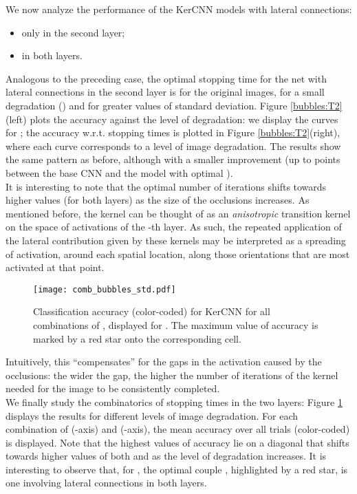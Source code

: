 \documentclass[11pt,oneside,reqno]{amsart}
\begin{document}
 We now analyze the performance of the KerCNN models with lateral connections:
  \begin{itemize}
  \item only in the second layer;
  \item in both layers.
 \end{itemize}
 Analogous to the preceding case, the optimal stopping time for the net with lateral connections in the second layer is  for the original images,  for a small degradation () and  for greater values of standard deviation. Figure \ref{bubbles:T2}(left) plots the accuracy against the level of degradation: we display the curves for ; the accuracy w.r.t. stopping times  is plotted in Figure \ref{bubbles:T2}(right), where each curve corresponds to a level of image degradation. The results show the same pattern as before, although with a smaller improvement (up to  points between the base CNN and the model with optimal ).\\
 It is interesting to note that the optimal number of iterations shifts towards higher values (for both layers) as the size of the occlusions increases. As mentioned before, the kernel  can be thought of as an \emph{anisotropic} transition kernel on the space of activations of the -th layer. As such, the repeated application of the lateral contribution given by these kernels may be interpreted as a spreading of activation, around each spatial location, along those orientations that are most activated at that point. 
 \begin{figure}[htbp!]
  \centering
 \texttt{[image: comb\_bubbles\_std.pdf]}
 \caption{Classification accuracy (color-coded) for KerCNN for all combinations of , displayed for . The maximum value of accuracy is marked by a red star onto the corresponding cell.}\label{comb_bubbles}
 \end{figure}
 Intuitively, this ``compensates'' for the gaps in the activation caused by the occlusions: the wider the gap, the higher the number of iterations of the kernel needed for the image to be consistently completed.\\
 We finally study the combinatorics of stopping times  in the two layers: Figure \ref{comb_bubbles} displays the results for different levels of image degradation. For each combination of  (-axis) and  (-axis), the mean accuracy over all trials (color-coded) is displayed. Note that the highest values of accuracy lie on a diagonal that shifts towards higher values of both  and  as the level of degradation increases. It is interesting to observe that, for , the optimal couple , highlighted by a red star, is one involving lateral connections in both layers.
 
\end{document}
